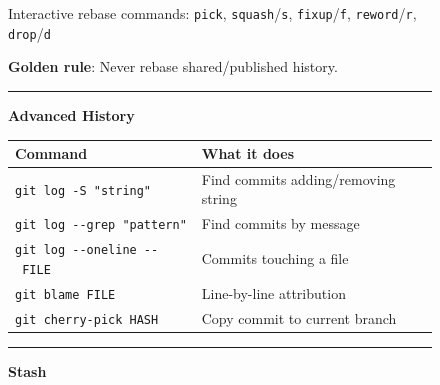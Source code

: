 \documentclass[
  9pt,
  a4paper,
  DIV=11,
  numbers=noendperiod]{scrartcl}
\begin{document}
\begin{figure}
\begin{minipage}{0.50\linewidth}
\end{minipage}%
\newline
\begin{minipage}{0.50\linewidth}
Interactive rebase commands: \texttt{pick}, \texttt{squash}/\texttt{s},
\texttt{fixup}/\texttt{f}, \texttt{reword}/\texttt{r},
\texttt{drop}/\texttt{d}\end{minipage}%
%
\begin{minipage}{0.50\linewidth}
\textbf{Golden rule}: Never rebase shared/published
history.\end{minipage}%
\newline
\begin{minipage}{0.50\linewidth}

\begin{center}\rule{0.5\linewidth}{0.5pt}\end{center}

\end{minipage}%
%
\begin{minipage}{0.50\linewidth}
\textbf{Advanced History}\end{minipage}%
\newline
\begin{minipage}{0.50\linewidth}

\begin{longtable}[]{@{}ll@{}}
\toprule\noalign{}
Command & What it does \\
\midrule\noalign{}
\endhead
\bottomrule\noalign{}
\endlastfoot
\texttt{git\ log\ -S\ "string"} & Find commits adding/removing string \\
\texttt{git\ log\ -\/-grep\ "pattern"} & Find commits by message \\
\texttt{git\ log\ -\/-oneline\ -\/-\ FILE} & Commits touching a file \\
\texttt{git\ blame\ FILE} & Line-by-line attribution \\
\texttt{git\ cherry-pick\ HASH} & Copy commit to current branch \\
\end{longtable}

\end{minipage}%
%
\begin{minipage}{0.50\linewidth}

\begin{center}\rule{0.5\linewidth}{0.5pt}\end{center}

\end{minipage}%
\newline
\begin{minipage}{0.50\linewidth}
\textbf{Stash}\end{minipage}%
%
\begin{minipage}{0.50\linewidth}


\end{minipage}
\end{figure}
\end{document}
